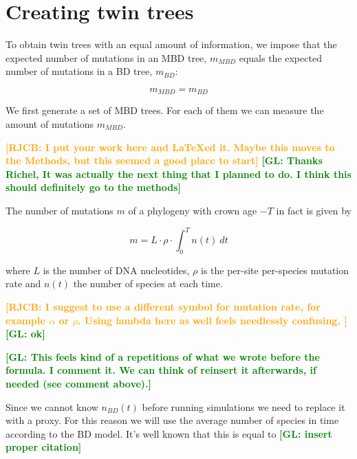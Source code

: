 \documentclass{article}
\newcommand*\richel[1]{\textcolor{orange}{\textbf{[RJCB: #1]}}}
\newcommand*\gio[1]{\textcolor{green}{\textbf{[GL: #1]}}}
\begin{document}
\appendix

\section{Creating twin trees}

To obtain twin trees with an equal amount of information, we impose
that the expected number of mutations in an MBD tree, $m_{MBD}$ equals
the expected number of mutations in a BD tree, $m_{BD}$:

\begin{equation}
m_{MBD} = m_{BD} \label{m equivalence}
\end{equation} 

We first generate a set of MBD trees. For each of them we can measure the amount of mutations $m_{MBD}$.

\richel{I put your work here and LaTeXed it. Maybe this moves
to the Methods, but this seemed a good place to start}
\gio{Thanks Richel, It was actually the next thing that I planned to do. I think this should definitely go to the methods}

The number of mutations $m$ of a phylogeny 
with crown age $-T$ in fact is given by

\begin{equation}
m = L \cdot \rho \cdot \int_{0}^{T} n(t)\ dt \label{m calculation}
\end{equation}

where $L$ is the number of DNA nucleotides, 
$\rho$ is the per-site per-species mutation rate and
$n(t)$ the number of species at each time.

\richel{I suggest to use a different symbol for mutation rate, 
  for example $\alpha$ or $\rho$. Using lambda here as well feels
  needlessly confusing.
}
\gio{ok}

\gio{This feels kind of a repetitions of what we wrote before the formula. I comment it. We can think of reinsert it afterwards, if needed (see comment above).}

Since we cannot know $n_{BD}(t)$ before running simulations
we need to replace it with a proxy. For this reason we will use the average number of
species in time according to the BD model. 
It's well known that this is equal to \gio{insert proper citation}
\end{document}
